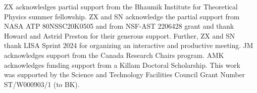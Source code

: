 \documentclass[%
 reprint,
 amsmath,amssymb,
 aps,
]{revtex4-2}
\begin{document}
% 


\acknowledgments
ZX acknowledges partial support from the Bhaumik Institute for Theoretical Physics summer fellowship. ZX and SN acknowledge the partial support from NASA ATP 80NSSC20K0505 and from NSF-AST 2206428 grant and thank Howard and Astrid Preston for their generous support. Further, ZX and SN thank LISA Sprint 2024 for organizing an interactive and productive meeting. JM acknowledges support from the Canada Research Chairs program. AMK acknowledges funding support from a Killam Doctoral Scholarship. This work was supported by the Science and Technology Facilities Council Grant Number ST/W000903/1 (to BK).






\end{document}
